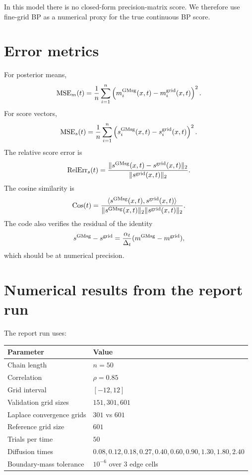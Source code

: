 \documentclass[11pt]{article}
\begin{document}
In this model there is no closed-form precision-matrix score. We therefore use fine-grid BP as a numerical proxy for the true continuous BP score.

\section{Error metrics}

For posterior means,
\begin{equation}
  \operatorname{MSE}_m(t)
  = \frac1n\sum_{i=1}^n
  \left(m_i^{\rm GMsg}(x,t)-m_i^{\rm grid}(x,t)\right)^2.
\end{equation}
For score vectors,
\begin{equation}
  \operatorname{MSE}_s(t)
  = \frac1n\sum_{i=1}^n
  \left(s_i^{\rm GMsg}(x,t)-s_i^{\rm grid}(x,t)\right)^2.
\end{equation}
The relative score error is
\begin{equation}
  \operatorname{RelErr}_s(t)
  = \frac{\|s^{\rm GMsg}(x,t)-s^{\rm grid}(x,t)\|_2}
  {\|s^{\rm grid}(x,t)\|_2}.
\end{equation}
The cosine similarity is
\begin{equation}
  \operatorname{Cos}(t)
  = \frac{\langle s^{\rm GMsg}(x,t),s^{\rm grid}(x,t)\rangle}
  {\|s^{\rm GMsg}(x,t)\|_2\|s^{\rm grid}(x,t)\|_2}.
\end{equation}
The code also verifies the residual of the identity
\begin{equation}
  s^{\rm GMsg}-s^{\rm grid}
  =\frac{\alpha_t}{\Delta_t}(m^{\rm GMsg}-m^{\rm grid}),
\end{equation}
which should be at numerical precision.

\section{Numerical results from the report run}
\label{sec:results}

The report run uses:
\begin{center}
\begin{tabular}{ll}
\toprule
Parameter & Value \\
\midrule
Chain length & \(n=50\) \\
Correlation & \(\rho=0.85\) \\
Grid interval & \([-12,12]\) \\
Validation grid sizes & \(151,301,601\) \\
Laplace convergence grids & \(301\) vs \(601\) \\
Reference grid size & \(601\) \\
Trials per time & \(50\) \\
Diffusion times & \(0.08,0.12,0.18,0.27,0.40,0.60,0.90,1.30,1.80,2.40\) \\
Boundary-mass tolerance & \(10^{-6}\) over 3 edge cells \\
\bottomrule
\end{tabular}
\end{center}
\end{document}
